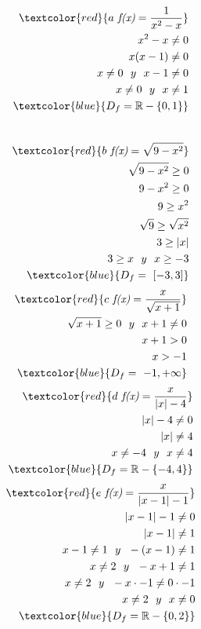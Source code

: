 \documentclass[titlepage,12pt]{article}
\begin{document}
\newpage

\begin{align*}
    \textcolor{red}{a \textit{ f(x)} = \frac{1}{x^2-x}}\\
    x^2-x \neq0\\
    x(x-1)\neq0\\
    x\neq0\ \ y\ \ x-1\neq0\\
    x\neq0\ \ y\ \ x\neq1\\
    \textcolor{blue}{D_f = \mathbb{R} - \{0,1\} }
\end{align*}\\
\begin{align*}
    \textcolor{red}{b \textit{ f(x)} = \sqrt{9-x^2}}\\
    \sqrt{9-x^2} \geq 0\\
    9-x^2 \geq 0\\
    9\geq x^2\\
    \sqrt{9} \geq \sqrt{x^2}\\
    3 \geq |x|\\
    3 \geq x \ \ y \ \ x \geq -3\\
    \textcolor{blue}{D_f =\ [-3,3] }
\end{align*}
\newpage    
\begin{align*}
    \textcolor{red}{c \textit{ f(x)} = \frac{x}{\sqrt{x+1}}}\\
    \sqrt{x+1} \geq 0 \ \ y \ \ x+1\neq 0\\
    x+1>0\\
    x>-1\\
    \textcolor{blue}{D_f =\ -1,+\infty }\\
\end{align*}
\begin{align*}
    \textcolor{red}{d \textit{ f(x)} = \frac{x}{|x|-4}}\\
    |x|-4\neq 0\\
    |x|\neq 4\\
    x\neq -4 \ \ y \ \ x\neq 4\\
    \textcolor{blue}{D_f = \mathbb{R} - \{-4,4\} }\\
\end{align*}
\begin{align*}
    \textcolor{red}{e \textit{ f(x)} = \frac{x}{|x-1|-1}}\\
    |x-1|-1\neq 0\\
    |x-1|\neq 1\\
    x-1\neq 1 \ \ y \ \ -(x-1)\neq 1\\
    x \neq 2 \ \ y \ \ -x+1\neq 1\\
    x \neq 2 \ \ y \ \ -x\cdot-1\neq 0\cdot-1\\
    x \neq 2 \ \ y \ \ x\neq 0\\
    \textcolor{blue}{D_f = \mathbb{R} - \{0,2\} }
\end{align*}
\end{document}
